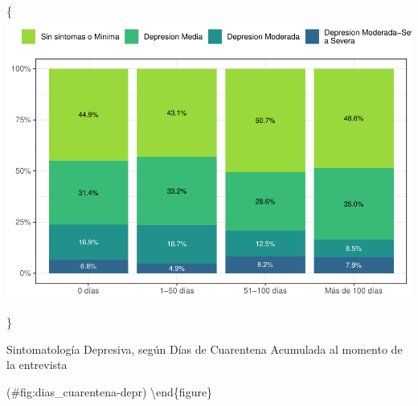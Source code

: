 \documentclass[
  12pt,
]{book}
\begin{document}
\{\centering \includegraphics{reporte-elsoc_files/figure-latex/dias_cuarentena-depr-1}

\}

\caption{Sintomatología Depresiva, según Días de Cuarentena Acumulada al momento de la entrevista}

(\#fig:dias\_cuarentena-depr)
\textbackslash end\{figure\}
\end{document}
